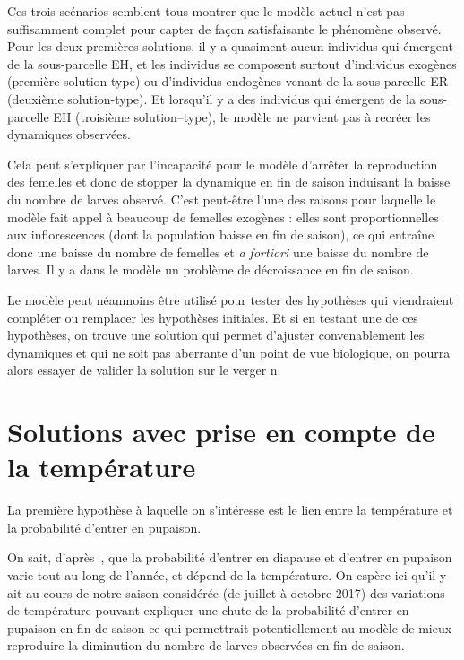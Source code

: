 Ces trois scénarios semblent tous montrer que le modèle actuel n'est pas suffisamment complet pour capter de façon satisfaisante le phénomène observé.
Pour les deux premières solutions, il y a quasiment aucun individus qui émergent de la sous-parcelle EH, et les individus se composent surtout d'individus exogènes (première solution-type) ou d'individus endogènes venant de la sous-parcelle ER (deuxième solution-type).
Et lorsqu'il y a des individus qui émergent de la sous-parcelle EH (troisième solution--type), le modèle ne parvient pas à recréer les dynamiques observées.

Cela peut s'expliquer par l'incapacité pour le modèle d'arrêter la reproduction des femelles et donc de stopper la dynamique en fin de saison induisant la baisse du nombre de larves observé.
C'est peut-être l'une des raisons pour laquelle le modèle fait appel  à beaucoup de femelles exogènes : elles sont proportionnelles aux inflorescences (dont la population baisse en fin de saison), ce qui entraîne donc une baisse du nombre de femelles et \emph{a fortiori} une baisse du nombre de larves.
Il y a dans le modèle un problème de décroissance en fin de saison.

Le modèle peut néanmoins être utilisé pour tester des hypothèses qui viendraient compléter ou remplacer les hypothèses initiales.
Et si en testant une de ces hypothèses, on trouve une solution qui permet d'ajuster convenablement les dynamiques et qui ne soit pas aberrante d'un point de vue biologique, on pourra alors essayer de valider la solution sur le verger n.


 
 \clearpage

\section{Solutions avec prise en compte de la température}
\label{chap:temp}

La première hypothèse à laquelle on s'intéresse est le lien entre la température et la probabilité d'entrer en pupaison.

On sait, d'après~\citet{pauldiap}, que la probabilité d'entrer en diapause et d'entrer en pupaison varie tout au long de l'année, et dépend de la température.
On espère ici qu'il y ait au cours de notre saison considérée (de juillet à octobre 2017) des variations de température pouvant expliquer une chute de la probabilité d'entrer en pupaison en fin de saison ce qui permettrait potentiellement au modèle de mieux reproduire la diminution du nombre de larves observées en fin de saison.

